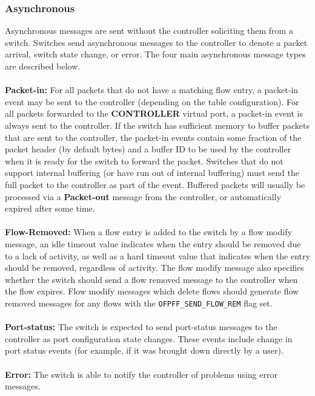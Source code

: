 \documentclass[10pt]{article}
\begin{document}
\subsubsection{Asynchronous}
\label{sec:asynchronous}
Asynchronous messages are sent without the controller soliciting them from a switch.  Switches send asynchronous messages to the controller to denote a packet arrival, switch state change, or error.  The four main asynchronous message types are described below.
\\\\
\textbf{Packet-in:} For all packets that do not have a matching flow entry, a packet-in event may be sent to the controller (depending on the table configuration). For all packets forwarded to the \textbf{CONTROLLER} virtual port, a packet-in event is always sent to the controller.  If the switch has sufficient memory to buffer packets that are sent to the controller, the packet-in events contain some fraction of the packet header (by default  bytes) and a buffer ID to be used by the controller when it is ready for the switch to forward the packet.  Switches that do not support internal buffering (or have run out of internal buffering) must send the full packet to the controller as part of the event. Buffered packets will usually be processed via a \textbf{Packet-out} message from the controller, or automatically expired after some time.
\\\\
\textbf{Flow-Removed:} When a flow entry is added to the switch by a flow modify message, an idle timeout value indicates when the entry should be removed due to a lack of activity, as well as a hard timeout value that indicates when the entry should be removed, regardless of activity.  The flow modify message also specifies whether the switch should send a flow removed message to the controller when the flow expires.  Flow modify messages which delete flows should generate flow removed messages for any flows with the \verb|OFPFF_SEND_FLOW_REM| flag set.
\\\\
\textbf{Port-status:} The switch is expected to send port-status messages to the controller as port configuration state changes.  These events include change in port status events (for example, if it was brought down directly by a user).
\\\\
\textbf{Error:} The switch is able to notify the controller of problems using error messages. 
\end{document}
